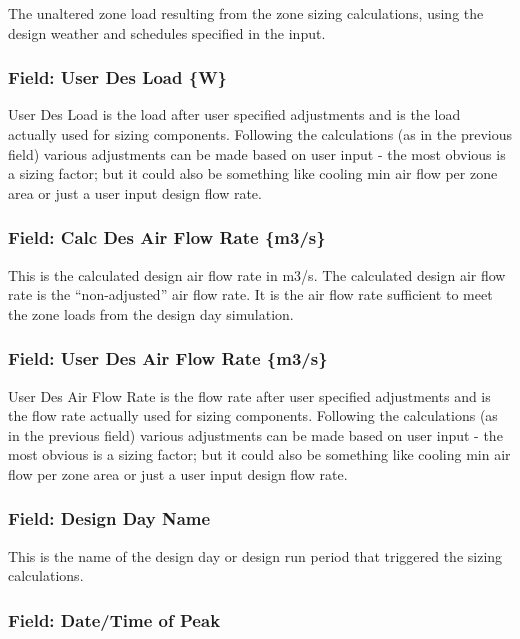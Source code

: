 The unaltered zone load resulting from the zone sizing calculations, using the design weather and schedules specified in the input.

\subsubsection{Field: User Des Load \{W\}}\label{field-user-des-load-w}

User Des Load is the load after user specified adjustments and is the load actually used for sizing components. Following the calculations (as in the previous field) various adjustments can be made based on user input - the most obvious is a sizing factor; but it could also be something like cooling min air flow per zone area or just a user input design flow rate.

\subsubsection{Field: Calc Des Air Flow Rate \{m3/s\}}\label{field-calc-des-air-flow-rate-m3s}

This is the calculated design air flow rate in m3/s. The calculated design air flow rate is the ``non-adjusted'' air flow rate. It is the air flow rate sufficient to meet the zone loads from the design day simulation.

\subsubsection{Field: User Des Air Flow Rate \{m3/s\}}\label{field-user-des-air-flow-rate-m3s}

User Des Air Flow Rate is the flow rate after user specified adjustments and is the flow rate actually used for sizing components. Following the calculations (as in the previous field) various adjustments can be made based on user input - the most obvious is a sizing factor; but it could also be something like cooling min air flow per zone area or just a user input design flow rate.

\subsubsection{Field: Design Day Name}\label{field-design-day-name}

This is the name of the design day or design run period that triggered the sizing calculations.

\subsubsection{Field: Date/Time of Peak}\label{field-datetime-of-peak}


